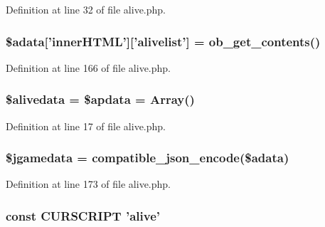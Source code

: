 Definition at line 32 of file alive.\+php.

\hypertarget{alive_8php_a96ac8e7c585d920222762dce8dafb1db}{
\subsubsection[{\$adata}]{\setlength{\rightskip}{0pt plus 5cm}\$adata\mbox{[}'inner\+H\+T\+M\+L'\mbox{]}\mbox{[}'alivelist'\mbox{]} = ob\+\_\+get\+\_\+contents()}}\label{alive_8php_a96ac8e7c585d920222762dce8dafb1db}


Definition at line 166 of file alive.\+php.

\hypertarget{alive_8php_a2a073f681012b1c4833ff46628277e6c}{
\subsubsection[{\$alivedata}]{\setlength{\rightskip}{0pt plus 5cm}\$alivedata = \$apdata = Array()}}\label{alive_8php_a2a073f681012b1c4833ff46628277e6c}


Definition at line 17 of file alive.\+php.

\hypertarget{alive_8php_ad8ad32ee4a34333c6c5c5b4379a80cf2}{
\subsubsection[{\$jgamedata}]{\setlength{\rightskip}{0pt plus 5cm}\$jgamedata = {\bf compatible\+\_\+json\+\_\+encode}(\$adata)}}\label{alive_8php_ad8ad32ee4a34333c6c5c5b4379a80cf2}


Definition at line 173 of file alive.\+php.

\hypertarget{alive_8php_a39c39f525eceb86cabc338804f230e80}{
\subsubsection[{C\+U\+R\+S\+C\+R\+I\+P\+T}]{\setlength{\rightskip}{0pt plus 5cm}const C\+U\+R\+S\+C\+R\+I\+P\+T 'alive'}}\label{alive_8php_a39c39f525eceb86cabc338804f230e80}


